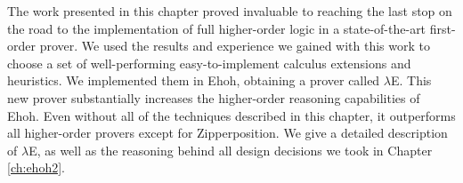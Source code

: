 



The work presented in this chapter proved invaluable to reaching the last stop
on the road to the implementation of full higher-order logic in a
state-of-the-art first-order prover. We used the results and experience we
gained with this work to choose a set of well-performing easy-to-implement
calculus extensions and heuristics. We implemented them in Ehoh, obtaining a
prover called $\lambda$E. This new prover substantially increases the
higher-order reasoning capabilities of Ehoh. Even without all of the techniques
described in this chapter, it outperforms all higher-order provers except for
Zipperposition. We give a detailed description of $\lambda$E, as well as the reasoning
behind all design decisions we took in Chapter \ref{ch:ehoh2}.



